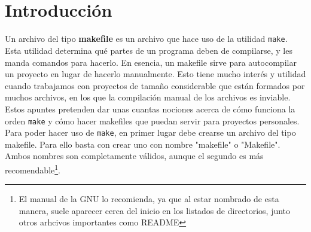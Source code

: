 \documentclass[11pt,twoside,titlepage,a4paper]{article}
\theoremstyle{definition}
\theoremstyle{plain_rojo}
\theoremstyle{remark}
\newcommand{\autores}{ %
	\begin{tabular}{l}
	Manuel Gachs Ballegeer
	\end{tabular}
}
\newcommand{\infoextra}{ %
}
\begin{document}
\begin{titlepage}
	\parbox[t]{\textwidth}{
		\raggedright
		\color{white}{\LARGE{\textbf{}}} \\
		\textit{\infoextra}
	}
	\vfill
	\parbox[c]{\textwidth}{
	}
	\vfill
	\parbox[t]{\textwidth}{
		\raggedright
		\color{white}{\Large{\autores}} \\
	}
\end{titlepage}
\restorepagecolor

\tableofcontents
\clearpage



\section{Introducción}

Un archivo del tipo \textbf{makefile} es un archivo que hace uso de la
utilidad \texttt{make}. Esta utilidad determina qué partes de un programa
deben de compilarse, y les manda comandos para hacerlo. En esencia, un
makefile sirve para autocompilar un proyecto en lugar de hacerlo manualmente.
Esto tiene mucho interés y utilidad cuando trabajamos con proyectos de tamaño
considerable que están formados por muchos archivos, en los que la compilación
manual de los archivos es inviable. Estos apuntes pretenden dar unas cuantas
nociones acerca de cómo funciona la orden \texttt{make} y cómo hacer makefiles
que puedan servir para proyectos personales.
\\

Para poder hacer uso de \texttt{make}, en primer lugar debe crearse un 
archivo del tipo makefile. Para ello basta con crear uno con nombre 
"makefile" o "Makefile". Ambos nombres son completamente válidos, aunque el 
segundo es más recomendable\footnote{El manual de la GNU lo recomienda, ya 
que al estar nombrado de esta manera, suele aparecer cerca del 
inicio en los listados de directorios, junto otros arhcivos importantes como 
README}.
\\
\end{document}
